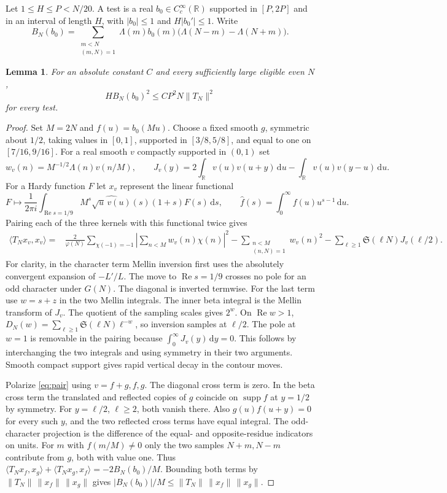 \documentclass[11pt,a4paper]{article}
\newtheorem{lemma}[theorem]{Lemma}
\newcommand{\SSg}{\mathfrak S}
\newcommand{\dd}{\,\mathrm d}
\DeclareMathOperator{\Rea}{Re}
\DeclareMathOperator{\supp}{supp}
\begin{document}
Let $1\le H\le P<N/20$. A test is a real $b_0\in C^\infty_c(\mathbb R)$ supported in $[P,2P]$ and in an interval of length $H$, with $|b_0|\le1$ and $H|b_0'|\le1$. Write
\[
 B_N(b_0)=\sum_{\substack{m<N\\(m,N)=1}}\Lambda(m)b_0(m)
                 \bigl(\Lambda(N-m)-\Lambda(N+m)\bigr).
\]
\begin{lemma}\label{lm:transfer}
For an absolute constant $C$ and every sufficiently large eligible even $N$,
\begin{equation}\label{eq:transfer}
 H B_N(b_0)^2\le C P^2 N\|T_N\|^2
\end{equation}
for every test.
\end{lemma}
\begin{proof}
Set $M=2N$ and $f(u)=b_0(Mu)$. Choose a fixed smooth $g$, symmetric about $1/2$, taking values in $[0,1]$, supported in $[3/8,5/8]$, and equal to one on $[7/16,9/16]$. For a real smooth $v$ compactly supported in $(0,1)$ set
\[
 w_v(n)=M^{-1/2}\Lambda(n)v(n/M),\qquad
 J_v(y)=2\int_{\mathbb R}v(u)v(u+y)\dd u-\int_{\mathbb R}v(u)v(y-u)\dd u.
\]
For a Hardy function $F$ let $x_v$ represent the linear functional
\[
 F\longmapsto\frac1{2\pi i}\int_{\Rea s=1/9}
 M^s\widehat{\sqrt u\,v(u)}(s)(1+s)F(s)\dd s,\qquad
 \widehat f(s)=\int_0^\infty f(u)u^{s-1}\dd u .
\]
Pairing each of the three kernels with this functional twice gives
\begin{align}
 \langle T_N x_v,x_v\rangle={}&
 \frac{2}{\varphi(N)}\sum_{\chi(-1)=-1}\left|\sum_{n<M}w_v(n)\chi(n)\right|^2
 -\sum_{\substack{n<M\\(n,N)=1}}w_v(n)^2
 -\sum_{\ell\ge1}\SSg(\ell N)J_v(\ell/2).
 \label{eq:pair}
\end{align}
For clarity, in the character term Mellin inversion first uses the absolutely convergent expansion of $-L'/L$. The move to $\Rea s=1/9$ crosses no pole for an odd character under $G(N)$. The diagonal is inverted termwise. For the last term use $w=s+z$ in the two Mellin integrals. The inner beta integral is the Mellin transform of $J_v$. The quotient of the sampling scales gives $2^w$. On $\Rea w>1$, $D_N(w)=\sum_{\ell\ge1}\SSg(\ell N)\ell^{-w}$, so inversion samples at $\ell/2$. The pole at $w=1$ is removable in the pairing because $\int_0^\infty J_v(y)\dd y=0$. This follows by interchanging the two integrals and using symmetry in their two arguments. Smooth compact support gives rapid vertical decay in the contour moves.

Polarize \eqref{eq:pair} using $v=f+g,f,g$. The diagonal cross term is zero. In the beta cross term the translated and reflected copies of $g$ coincide on $\supp f$ at $y=1/2$ by symmetry. For $y=\ell/2$, $\ell\ge2$, both vanish there. Also $g(u)f(u+y)=0$ for every such $y$, and the two reflected cross terms have equal integral. The odd-character projection is the difference of the equal- and opposite-residue indicators on units. For $m$ with $f(m/M)\ne0$ only the two samples $N+m,N-m$ contribute from $g$, both with value one. Thus $\langle T_N x_f,x_g\rangle+\langle T_N x_g,x_f\rangle=-2B_N(b_0)/M$. Bounding both terms by $\|T_N\|\,\|x_f\|\,\|x_g\|$ gives $|B_N(b_0)|/M\le\|T_N\|\,\|x_f\|\,\|x_g\|$.


\end{proof}
\end{document}
